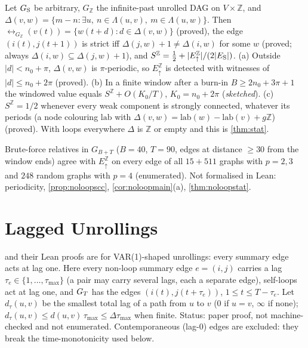 \begin{theorem}\label{thm:noloopstat}
Let $G_{\mathrm S}$ be arbitrary, $G_{\mathbb Z}$ the infinite-past unrolled DAG on
$V\times\mathbb Z$, and $\Delta(v,w)=\{m-n:\exists u,\ n\in\Lambda(u,v),\ m\in\Lambda(u,w)\}$.
Then $\rel_{G_\mathbb Z}(v(t))=\{w(t+d):d\in\Delta(v,w)\}$ (proved), the edge
$(i(t),j(t{+}1))$ is strict iff $\Delta(j,w)+1\ne\Delta(i,w)$ for some $w$
(proved; always $\Delta(i,w)\subseteq\Delta(j,w)+1$), and
$S^{\mathbb Z}=\tfrac12+|E^{\mathbb Z}_\uparrow|/(2|E_{\mathrm S}|)$. (a) Outside
$|d|<n_0+\pi$, $\Delta(v,w)$ is $\pi$-periodic, so $E^{\mathbb Z}_\uparrow$ is detected
with witnesses of $|d|\le n_0+2\pi$ (proved). (b) In a finite window after a
burn-in $B\ge 2n_0+3\pi+1$ the windowed value equals $S^{\mathbb Z}+O(K_0/T)$,
$K_0=n_0+2\pi$ (\emph{sketched}). (c) $S^{\mathbb Z}=1/2$ whenever every weak
component is strongly connected, whatever its periods (a node colouring
$\mathrm{lab}$ with $\Delta(v,w)=\mathrm{lab}(w)-\mathrm{lab}(v)+g\mathbb Z$)
(proved). With loops everywhere $\Delta$ is $\mathbb Z$ or empty and this is
\cref{thm:stat}.
\end{theorem}
Brute-force relatives in $G_{B+T}$ ($B=40$, $T=90$, edges at distance $\ge30$
from the window ends) agree with $E_\uparrow^{\mathbb Z}$ on every edge of all
$15+511$ graphs with $p=2,3$ and $248$ random graphs with $p=4$ (enumerated).
Not formalised in Lean: periodicity, \cref{prop:noloopscc}, \cref{cor:noloopmain}(a),
\cref{thm:noloopstat}.

\section{Lagged Unrollings}
\label{app:lags}

 and their Lean proofs are for VAR(1)-shaped
unrollings: every summary edge acts at lag one. Here every non-loop summary
edge $e=(i,j)$ carries a lag $\tau_e\in\{1,\dots,\tau_{\max}\}$ (a pair may carry
several lags, each a separate edge), self-loops act at lag one, and $G_T$ has
the edges $(i(t),j(t{+}\tau_e))$, $1\le t\le T-\tau_e$. Let $d_\tau(u,v)$ be the
smallest total lag of a path from $u$ to $v$ ($0$ if $u=v$, $\infty$ if none);
$d_\tau(u,v)\le d(u,v)\,\tau_{\max}\le\Delta\tau_{\max}$ when finite. Status: paper proof, not
machine-checked and not enumerated. Contemporaneous (lag-0) edges are excluded:
they break the time-monotonicity used below.

